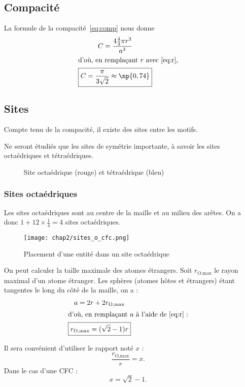 \subsection{Compacité}
La formule de la compacité~\ref{eq:comp} nous donne
\begin{gather}
    C = \frac{4 \frac{4}{3} \pi r^3}{a^3}\\
    \intertext{d'où, en remplaçant $r$ avec~\ref{eq:r},}
    \boxed{C = \frac{\pi}{3\sqrt{2}} \approx \np{0,74}}
\end{gather}

\subsection{Sites}
Compte tenu de la compacité, il existe des sites entre les motifs.
\begin{rem}
    Ne seront étudiés que les sites de symétrie importante,
    à savoir les sites octaédriques et tétraédriques.
\end{rem}
\begin{figure}
    \centering
    
    \caption[Sites d'une structure cfc]
    {Site octaédrique (rouge) et tétraédrique (bleu)}\label{fig:2_cfc_sites}
\end{figure}
\subsubsection{Sites octaédriques}
Les sites octaédriques sont au centre de la maille et au milieu
des arêtes. On a donc $1 + 12 \times \frac{1}{4} = 4$ sites octaédriques.
\begin{figure}
    \centering
    \texttt{[image: chap2/sites\_o\_cfc.png]}
    \caption{Placement d'une entité dans un site octaédrique}\label{fig:site_o_cfc}
\end{figure}
On peut calculer la taille maximale des atomes étrangers.
Soit $r_{\text{O,max}}$ le rayon maximal d'un atome étranger.
Les sphères (atomes h\^otes et étrangers) étant tangentes le
long du c\^oté de la maille, on a :
\begin{gather}
    a = 2r + 2r_{\text{O,max}}\\
    \intertext{d'où, en remplaçant $a$ à l'aide de~\ref{eq:r} :}
    \boxed{r_{\text{O,max}} = (\sqrt{2} - 1)r} \label{eq:rmax}
\end{gather}
\begin{rem}
    Il sera convénient d'utiliser le rapport noté $x$ :
    \begin{equation*}
        \frac{r_{\text{O,max}}}{r} = x\text{.}
    \end{equation*}
    Dans le cas d'une CFC :
    \begin{equation*}
        x = \sqrt{2} - 1\text{.}
    \end{equation*}
\end{rem}

